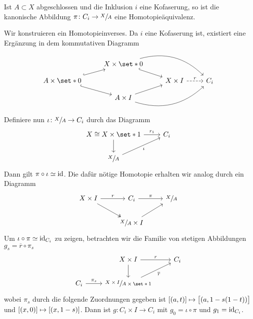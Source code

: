 \begin{satz}
	Ist $A \subset X$ abgeschlossen und die Inklusion $i$ eine Kofaserung, so ist die kanonische Abbildung $\pi\colon C_i \to \sfrac{X}{A}$ eine Homotopieäquivalenz.
\end{satz}
\begin{beweis}
	Wir konstruieren ein Homotopieinverses. 
	Da $i$ eine Kofaserung ist, existiert eine Ergänzung in dem kommutativen Diagramm
	\[
		\begin{tikzcd}[row sep=small]
			& X \times \set*{0}  \drar[hook] \ar[rrd,bend left] \\
			A \times \set*{0} \urar[hook] \drar[hook] & & X \times I \rar[dashed,"r"] & C_i \\
			& A \times I \urar \ar[urr,bend right]
		\end{tikzcd}
	\]
	Definiere nun $\iota \colon \sfrac{X}{A} \to C_i$ durch das Diagramm
	\[
		\begin{tikzcd}
			X \cong X \times \set*{1} \rar["r_1"] \dar & C_i \\
			\sfrac{X}{A} \urar["\iota"']
		\end{tikzcd}
	\]
	Dann gilt $\pi \circ \iota \simeq {\id}$.
	Die dafür nötige Homotopie erhalten wir analog durch ein Diagramm
	\[
		\begin{tikzcd}
			X \times I \rar["r"] \drar[two heads] & C_i \rar["\pi"] & \sfrac{X}{A} \\
			& \sfrac{X}{A} \times I \urar
		\end{tikzcd}
	\]
	Um $\iota \circ \pi \simeq {\id_{C_i}}$ zu zeigen, betrachten wir die Familie von stetigen Abbildungen $g_s = \overline{r} \circ \pi_s$
	\[
		\begin{tikzcd}
			&X \times I \rar["r"] \dar & C_i \\
			C_i \rar["\pi_s"] &\sfrac{X \times I}{A \times \set*{1}} \urar["\overline{r}"']
		\end{tikzcd}
	\]
	wobei $\pi_s$ durch die folgende Zuordnungen gegeben ist $\benbrace*{(a,t)} \mapsto \benbrace[\big]{(a, 1- s(1-t))}$ und $\benbrace*{(x,0)} \mapsto \benbrace*{(x,1-s)}$.
	Dann ist $g \colon C_i \times I \to C_i$ mit $g_0 = \iota \circ \pi$ und $g_1 = {\id}_{C_i}$.
\end{beweis}

